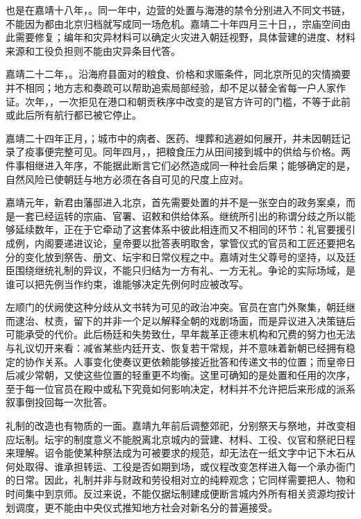 也是在嘉靖十八年，。同一年中，边营的处置与海港的禁令分别进入不同文书链，不能因为都由北京归档就写成同一场危机。嘉靖二十年四月三十日，，宗庙空间由此需要修复；编年和灾异材料可以确定火灾进入朝廷视野，具体营建的进度、材料来源和工役负担则不能由灾异条目代答。

嘉靖二十二年，。沿海府县面对的粮食、价格和求赈条件，同北京所见的灾情摘要并不相同；地方志和奏疏可以帮助追索局部经验，却不足以替全省每一户人家作证。次年，，一次拒见在港口和朝贡秩序中改变的是官方许可的门槛，不等于此前或此后所有航行都已被它停止。

嘉靖二十四年正月，；城市中的病者、医药、埋葬和逃避如何展开，并未因朝廷记录了疫事便完整可见。同年四月，，把粮食压力从田间接到城中的供给与价格。两件事相继进入年序，不能据此断言它们必然造成同一种社会后果；能够确定的是，自然风险已使朝廷与地方必须在各自可见的尺度上应对。

嘉靖元年，新君由藩邸进入北京，首先需要处置的并不是一张空白的政务案桌，而是一套已经运转的宗庙、官署、诏敕和供给体系。继统所引出的称谓分歧之所以能够延续数年，正在于它牵动了这套体系中彼此相连而又不相同的环节：礼官要援引成例，内阁要递进议论，皇帝要以批答表明取舍，掌管仪式的官员和工匠还要把名分的变化放到祭告、册文、坛宇和日常仪程之中。嘉靖对生父尊号的坚持，以及廷臣围绕继统礼制的异议，不能只归结为一方有礼、一方无礼。争论的实际场域，是谁可以把先例当作约束，谁能够决定先例何时应被改写。

左顺门的伏阙使这种分歧从文书转为可见的政治冲突。官员在宫门外聚集，朝廷继而逮治、杖责，留下的并非一个足以解释全朝的戏剧场面，而是异议进入决策链后可能承受的代价。此后杨廷和失势致仕，早年裁革正德末机构和冗费的努力也无法与礼议切开来看：减省某些内廷开支、恢复若干常规，并不意味着新朝已经拥有稳定的协作关系。人事变化使奏议更依赖能够接近批答和传递文书的位置；而皇帝日后减少常朝，又使这些位置的轻重更不均衡。这里可确知的是处置和任用的次序，至于每一位官员在殿中或私下究竟如何影响决定，材料并不允许把后来形成的派系叙事倒投回每一次批答。

礼制的改造也有物质的一面。嘉靖九年前后调整郊祀，分别祭天与祭地，并改变相应坛制。坛宇的制度意义不能脱离北京城内的营建、材料、工役、仪官和祭祀日程来理解。诏令能使某种祭法成为可被要求的规范，却无法在一纸文字中记下木石从何处取得、谁承担转运、工役是否如期到场，或仪程改变怎样进入每一个承办衙门的日常。因此，礼制并非与财政和劳役相对立的纯粹观念；它同样需要把人、物和时间集中到京师。反过来说，不能仅据坛制建成便断言城内外所有相关资源均按计划调度，更不能由中央仪式推知地方社会对新名分的普遍接受。

